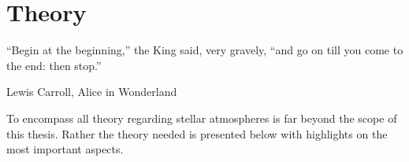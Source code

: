 \chapter{Theory}
\label{cha:theory}

\epigraph{``Begin at the beginning,'' the King said, very gravely, ``and go on till you come to the
          end: then stop.''}{Lewis Carroll, Alice in Wonderland}

To encompass all theory regarding stellar atmospheres is far beyond the scope of this thesis. Rather
the theory needed is presented below with highlights on the most important aspects.

%
%
%
